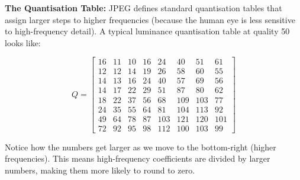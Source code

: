\textbf{The Quantisation Table:} JPEG defines standard quantisation tables that assign larger steps to higher frequencies (because the human eye is less sensitive to high-frequency detail). A typical luminance quantisation table at quality 50 looks like:

\[
Q = \begin{bmatrix}
16 & 11 & 10 & 16 & 24 & 40 & 51 & 61 \\
12 & 12 & 14 & 19 & 26 & 58 & 60 & 55 \\
14 & 13 & 16 & 24 & 40 & 57 & 69 & 56 \\
14 & 17 & 22 & 29 & 51 & 87 & 80 & 62 \\
18 & 22 & 37 & 56 & 68 & 109 & 103 & 77 \\
24 & 35 & 55 & 64 & 81 & 104 & 113 & 92 \\
49 & 64 & 78 & 87 & 103 & 121 & 120 & 101 \\
72 & 92 & 95 & 98 & 112 & 100 & 103 & 99
\end{bmatrix}
\]

Notice how the numbers get larger as we move to the bottom-right (higher frequencies). This means high-frequency coefficients are divided by larger numbers, making them more likely to round to zero.


